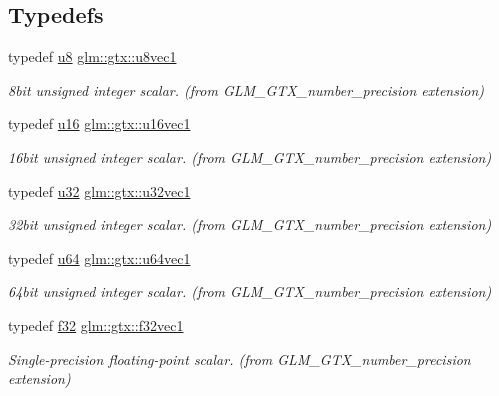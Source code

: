 \subsection*{Typedefs}
\begin{DoxyCompactItemize}
\item 
typedef \hyperlink{group__gtc__type__precision_ga5e3dc67373d5068997d2d9f41c9024d2}{u8} \hyperlink{group__gtx__number__precision_ga35ae7849593a354420e4f52d1b36c2d6}{glm\+::gtx\+::u8vec1}
\begin{DoxyCompactList}\small\item\em 8bit unsigned integer scalar. (from G\+L\+M\+\_\+\+G\+T\+X\+\_\+number\+\_\+precision extension) \end{DoxyCompactList}\item 
typedef \hyperlink{group__gtc__type__precision_gae7a1571503f83d2264ddfa705a6b082a}{u16} \hyperlink{group__gtx__number__precision_ga807d7e5f24e981b1575bd40ca159781d}{glm\+::gtx\+::u16vec1}
\begin{DoxyCompactList}\small\item\em 16bit unsigned integer scalar. (from G\+L\+M\+\_\+\+G\+T\+X\+\_\+number\+\_\+precision extension) \end{DoxyCompactList}\item 
typedef \hyperlink{group__gtc__type__precision_ga54e837745059fd29017bed71cfa0a8db}{u32} \hyperlink{group__gtx__number__precision_gac46a7890b20928df83e734c3ea9557d4}{glm\+::gtx\+::u32vec1}
\begin{DoxyCompactList}\small\item\em 32bit unsigned integer scalar. (from G\+L\+M\+\_\+\+G\+T\+X\+\_\+number\+\_\+precision extension) \end{DoxyCompactList}\item 
typedef \hyperlink{group__gtc__type__precision_ga71cedd4972f9cb1a5e14dfe5ab83ecd7}{u64} \hyperlink{group__gtx__number__precision_ga92812a1d7e746bcaba61d2f5a64afc52}{glm\+::gtx\+::u64vec1}
\begin{DoxyCompactList}\small\item\em 64bit unsigned integer scalar. (from G\+L\+M\+\_\+\+G\+T\+X\+\_\+number\+\_\+precision extension) \end{DoxyCompactList}\item 
typedef \hyperlink{group__gtc__type__precision_ga0ec999b57f5330d9021256e96038df04}{f32} \hyperlink{group__gtx__number__precision_gadab8e598b0b4697629482682bdb7f223}{glm\+::gtx\+::f32vec1}
\begin{DoxyCompactList}\small\item\em Single-\/precision floating-\/point scalar. (from G\+L\+M\+\_\+\+G\+T\+X\+\_\+number\+\_\+precision extension) \end{DoxyCompactList}\item 

\end{DoxyCompactItemize}
